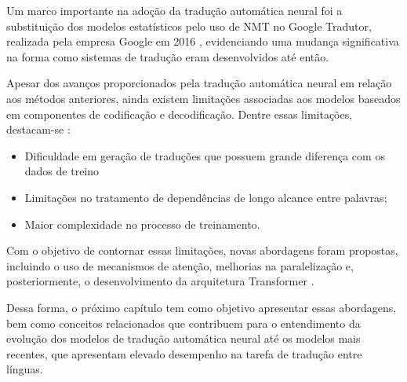 Um marco importante na adoção da tradução automática neural foi a substituição dos modelos estatísticos pelo uso de NMT no Google Tradutor, realizada pela empresa Google em 2016 \cite{schuster2016zeroshot}, evidenciando uma mudança significativa na forma como sistemas de tradução eram desenvolvidos até então.

Apesar dos avanços proporcionados pela tradução automática neural em relação aos métodos anteriores, ainda existem limitações associadas aos modelos baseados em componentes de codificação e decodificação. Dentre essas limitações, destacam-se \cite{DBLP:journals/corr/abs-1709-07809,DBLP:journals/corr/VaswaniSPUJGKP17}:

\begin{itemize}
    \item Dificuldade em geração de traduções que possuem grande diferença com os dados de treino
    \item Limitações no tratamento de dependências de longo alcance entre palavras;
    \item Maior complexidade no processo de treinamento.
\end{itemize}


Com o objetivo de contornar essas limitações, novas abordagens foram propostas, incluindo o uso de mecanismos de atenção, melhorias na paralelização e, posteriormente, o desenvolvimento da arquitetura Transformer \cite{DBLP:journals/corr/VaswaniSPUJGKP17}.

Dessa forma, o próximo capítulo tem como objetivo apresentar essas abordagens, bem como conceitos relacionados que contribuem para o entendimento da evolução dos modelos de tradução automática neural até os modelos mais recentes, que apresentam elevado desempenho na tarefa de tradução entre línguas.



